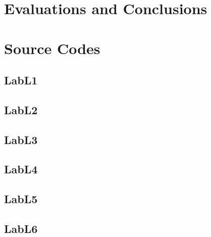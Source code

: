 \documentclass{article}
\begin{document}

\section{Evaluations and Conclusions}



\section{Source Codes}


\subsection{LabL1}



\subsection{LabL2}



\subsection{LabL3}



\subsection{LabL4}



\subsection{LabL5}



\subsection{LabL6}


\end{document}

